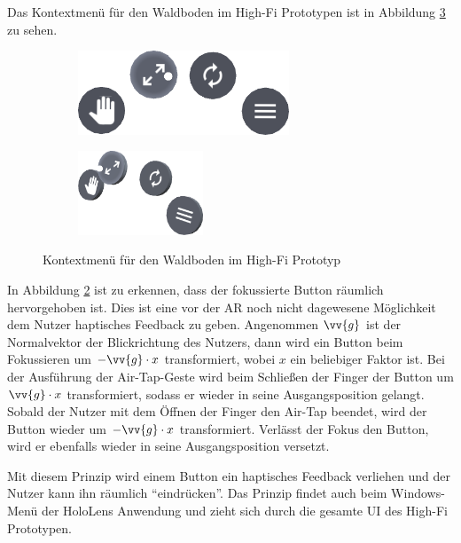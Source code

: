 Das Kontextmenü für den Waldboden im High-Fi Prototypen ist in Abbildung \ref{fig:context-menu} zu sehen.

\begin{figure}[htb]
  \centering
  \begin{subfigure}[b]{\fwidth}
    \centering
    \includegraphics[height=2.5cm]{figures/context-menu-front}
     \label{fig:context-menu-front}
  \end{subfigure}
  \begin{subfigure}[b]{\fwidth}
    \centering
  	\includegraphics[height=2.5cm]{figures/context-menu-side}
  	 \label{fig:context-menu-side}
  \end{subfigure}
  \caption{Kontextmenü für den Waldboden im High-Fi Prototyp} \label{fig:context-menu}
\end{figure}

In Abbildung \ref{fig:context-menu-side} ist zu erkennen, dass der fokussierte Button räumlich hervorgehoben ist. Dies ist eine vor der AR noch nicht dagewesene Möglichkeit dem Nutzer haptisches Feedback zu geben. Angenommen $\vv{g}$ ist der Normalvektor der Blickrichtung des Nutzers, dann wird ein Button beim Fokussieren um $-\vv{g} \cdot x$ transformiert, wobei $x$ ein beliebiger Faktor ist. Bei der Ausführung der Air-Tap-Geste wird beim Schließen der Finger der Button um $\vv{g} \cdot x$ transformiert, sodass er wieder in seine Ausgangsposition gelangt. Sobald der Nutzer mit dem Öffnen der Finger den Air-Tap beendet, wird der Button wieder um $-\vv{g} \cdot x$ transformiert. Verlässt der Fokus den Button, wird er ebenfalls wieder in seine Ausgangsposition versetzt.

Mit diesem Prinzip wird einem Button ein haptisches Feedback verliehen und der Nutzer kann ihn räumlich "`eindrücken"'. Das Prinzip findet auch beim Windows-Menü der HoloLens Anwendung und zieht sich durch die gesamte UI des High-Fi Prototypen.

